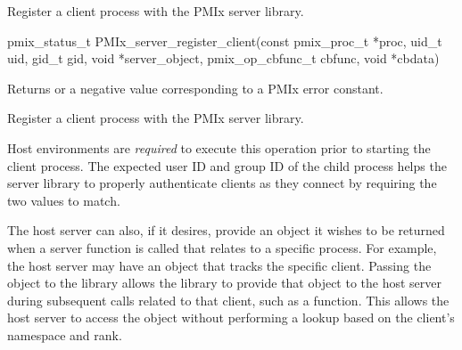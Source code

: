 \summary

Register a client process with the PMIx server library.

\format

\cspecificstart
\begin{codepar}
pmix_status_t
PMIx_server_register_client(const pmix_proc_t *proc,
                        uid_t uid, gid_t gid,
                        void *server_object,
                        pmix_op_cbfunc_t cbfunc, void *cbdata)
\end{codepar}
\cspecificend

\begin{arglist}
\end{arglist}

Returns  or a negative value corresponding to a PMIx error constant.

\descr

Register a client process with the PMIx server library.

\advicermstart
Host environments are \textit{required} to execute this operation prior to starting the client process.
The expected user ID and group ID of the child process helps the server library to properly authenticate clients as they connect by requiring the two values to match.
\advicermend

The host server can also, if it desires, provide an object it wishes to be returned when a server function is called that relates to a specific process.
For example, the host server may have an object that tracks the specific client.
Passing the object to the library allows the library to provide that object to the host server during subsequent calls related to that client, such as a  function.  This allows the host server to access the object without performing a lookup based on the client's namespace and rank.


\subsection{}

